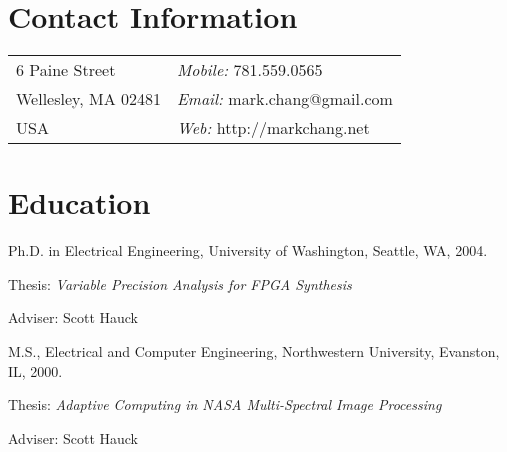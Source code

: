 \documentclass[line]{res}
\newenvironment{list1}{
  \begin{list}{\ding{113}}{%
      \setlength{\itemsep}{0in}
      \setlength{\parsep}{0in} \setlength{\parskip}{0in}
      \setlength{\topsep}{0in} \setlength{\partopsep}{0in} 
      \setlength{\leftmargin}{0.17in}}}{\end{list}}
\begin{document}

\begin{resume}
	
	\section{\sc Contact Information} \vspace{0.05in} 
	\begin{tabular}
		{@{}p{3in}p{2.5in}} 6 Paine Street & {\em Mobile:} 781.559.0565 \\
		Wellesley, MA 02481 & {\em Email:} mark.chang@gmail.com \\
		USA & {\em Web:} http://markchang.net \\
	\end{tabular}

	
	\section{\sc Education} Ph.D. in Electrical Engineering, University of Washington, Seattle, WA, 2004.\\
	\vspace*{-.15in} 
	\begin{list1}
		\item[] Thesis: {\em Variable Precision Analysis for FPGA Synthesis} 
		\item[] Adviser: Scott Hauck 
	\end{list1}
	
	M.S., Electrical and Computer Engineering, Northwestern University, Evanston, IL, 2000.\\
	\vspace*{-.15in} 
	\begin{list1}
		\item[] Thesis: {\em Adaptive Computing in NASA Multi-Spectral Image Processing} 
		\item[] Adviser: Scott Hauck 
	\end{list1}
	

\end{resume}
\end{document}
